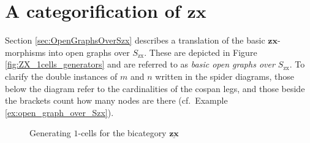 %
%

\section{A categorification of $\mathbf{zx}$}
\label{sec:zx_categorified}

Section \ref{sec:OpenGraphsOverSzx} 
describes a translation of
the basic $\mathbf{zx}$-morphisms 
into open graphs over $S_{\text{zx}}$.
These are depicted in 
Figure \ref{fig:ZX_1cells_generators}
and are referred to as 
\emph{basic open graphs over $S_{\text{zx}}$}.  
To clarify the double instances of $m$ and $n$ 
written in the spider diagrams, 
those below the diagram 
refer to the cardinalities of the cospan legs, 
and those beside the brackets 
count how many nodes are there
(cf.\ Example \ref{ex:open_graph_over_Szx}).  

\begin{figure}[h]
	\caption{
		Generating $1$-cells for the bicategory $\underline{\mathbf{zx}}$ }
	\label{fig:ZX 1cells_generators}
\end{figure} 

